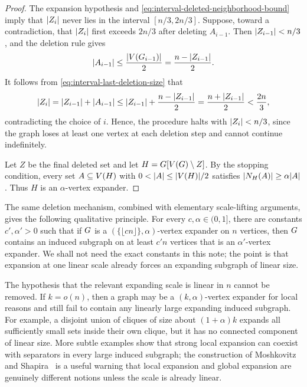 \begin{proof}
	The expansion hypothesis and \cref{eq:interval-deleted-neighborhood-bound} imply that \(\lvert Z_i\rvert\) never lies in the interval \([n/3,2n/3]\). Suppose, toward a contradiction, that \(\lvert Z_i\rvert\) first exceeds \(2n/3\) after deleting \(A_{i-1}\). Then \(\lvert Z_{i-1}\rvert<n/3\), and the deletion rule gives
	\begin{equation}
		\label{eq:interval-last-deletion-size}
		\lvert A_{i-1}\rvert\leq \frac{\lvert V(G_{i-1})\rvert}{2}=\frac{n-\lvert Z_{i-1}\rvert}{2}.
	\end{equation}
	It follows from \cref{eq:interval-last-deletion-size} that
	\begin{equation}
		\label{eq:interval-jump-contradiction}
		\lvert Z_i\rvert=\lvert Z_{i-1}\rvert+\lvert A_{i-1}\rvert\leq \lvert Z_{i-1}\rvert+\frac{n-\lvert Z_{i-1}\rvert}{2}=\frac{n+\lvert Z_{i-1}\rvert}{2}<\frac{2n}{3},
	\end{equation}
	contradicting the choice of \(i\). Hence, the procedure halts with \(\lvert Z_i\rvert<n/3\), since the graph loses at least one vertex at each deletion step and cannot continue indefinitely.

	Let \(Z\) be the final deleted set and let \(H=G[V(G)\setminus Z]\). By the stopping condition, every set \(A\subseteq V(H)\) with \(0<\lvert A\rvert\leq \lvert V(H)\rvert/2\) satisfies \(\lvert N_H(A)\rvert\geq \alpha\lvert A\rvert\). Thus \(H\) is an \(\alpha\)-vertex expander.
\end{proof}

The same deletion mechanism, combined with elementary scale-lifting arguments, gives the following qualitative principle. For every \(c,\alpha\in(0,1]\), there are constants \(c',\alpha'>0\) such that if \(G\) is a \((\{\lfloor cn\rfloor\},\alpha)\)-vertex expander on \(n\) vertices, then \(G\) contains an induced subgraph on at least \(c'n\) vertices that is an \(\alpha'\)-vertex expander. We shall not need the exact constants in this note; the point is that expansion at one linear scale already forces an expanding subgraph of linear size.

The hypothesis that the relevant expanding scale is linear in \(n\) cannot be removed. If \(k=o(n)\), then a graph may be a \((k,\alpha)\)-vertex expander for local reasons and still fail to contain any linearly large expanding induced subgraph. For example, a disjoint union of cliques of size about \((1+\alpha)k\) expands all sufficiently small sets inside their own clique, but it has no connected component of linear size. More subtle examples show that strong local expansion can coexist with separators in every large induced subgraph; the construction of Moshkovitz and Shapira~\cite{SODA:MosSha15} is a useful warning that local expansion and global expansion are genuinely different notions unless the scale is already linear.

